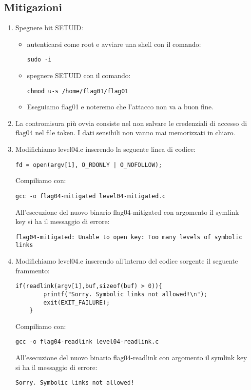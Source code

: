 \subsection{Mitigazioni}
\begin{enumerate}
    \item Spegnere bit SETUID:
    \begin{itemize}
        \item autenticarsi come root e avviare una shell con il comando: \begin{lstlisting}[style=bashstyle] 
        sudo -i
        \end{lstlisting}
        \item spegnere SETUID con il comando: \begin{lstlisting}[style=bashstyle] 
        chmod u-s /home/flag01/flag01
        \end{lstlisting}   
        \item Eseguiamo flag01 e noteremo che l’attacco non va a buon fine. 
    \end{itemize}
    \item La contromisura più ovvia consiste nel non salvare le credenziali di accesso di flag04 nel file token. I dati sensibili non vanno mai memorizzati in chiaro.
    \item Modifichiamo level04.c inserendo la seguente linea di codice:
    \begin{lstlisting}[style=cstyle]
    fd = open(argv[1], O_RDONLY | O_NOFOLLOW);
    \end{lstlisting}
    Compiliamo con:
    \begin{lstlisting}[style=bashstyle]
    gcc -o flag04-mitigated level04-mitigated.c
    \end{lstlisting}
    All'esecuzione del nuovo binario flag04-mitigated con argomento il symlink key si ha il messaggio di errore:
    \begin{lstlisting}[style=bashstyle]
    flag04-mitigated: Unable to open key: Too many levels of symbolic links
    \end{lstlisting} 
    \item Modifichiamo level04.c inserendo all'interno del codice sorgente il seguente frammento: 
    \begin{lstlisting}[style=cstyle]
    if(readlink(argv[1],buf,sizeof(buf) > 0)){
        printf("Sorry. Symbolic links not allowed!\n");
        exit(EXIT_FAILURE); 
    }
    \end{lstlisting} 
    Compiliamo con:
    \begin{lstlisting}[style=bashstyle]
    gcc -o flag04-readlink level04-readlink.c
    \end{lstlisting}
    All'esecuzione del nuovo binario flag04-readlink con argomento il symlink key si ha il messaggio di errore:
    \begin{lstlisting}[style=bashstyle]
    Sorry. Symbolic links not allowed!
    \end{lstlisting} 
\end{enumerate}

